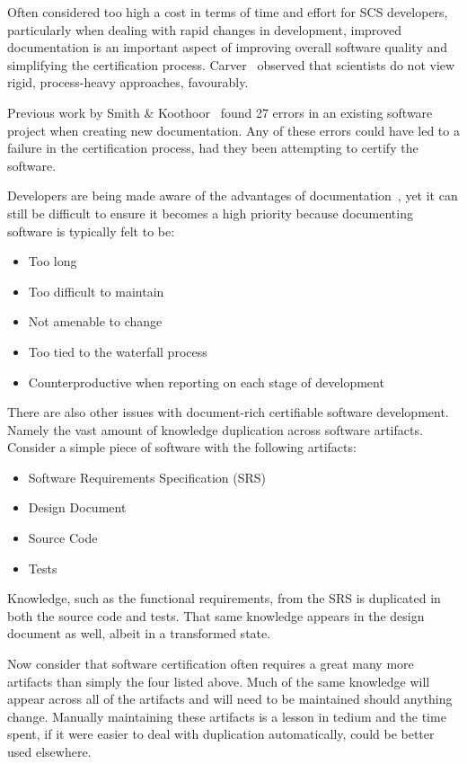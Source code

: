 \documentclass[sigconf]{acmart}
\begin{document}
Often considered too high a cost in terms of time and effort for SCS developers, 
particularly when dealing with rapid changes in development, improved 
documentation is an important aspect of improving overall software quality and 
simplifying the certification process. Carver~\cite{CarverEtAl2007} observed 
that scientists do not view rigid, process-heavy approaches, favourably. 

Previous work by Smith \& Koothoor~\citep{SmithAndKoothoor2016} found 27 errors 
in an existing software project when creating new documentation. Any of these errors could have led to a failure in the certification process, had they been attempting to certify the software.

Developers are being made aware of the advantages of documentation~\cite{SmithJegatheesanAndKelly2016}, yet it can still be difficult to ensure it becomes a high priority because documenting software is typically felt to be:

\begin{itemize}
\item Too long
\item Too difficult to maintain
\item Not amenable to change
\item Too tied to the waterfall process
\item Counterproductive when reporting on each stage of 
		development~\citep{Roache1998}
\end{itemize}

There are also other issues with document-rich certifiable software development. Namely the vast amount of knowledge duplication across software artifacts. Consider a simple piece of software with the following artifacts:

\begin{itemize}
\item Software Requirements Specification (SRS)
\item Design Document
\item Source Code
\item Tests
\end{itemize}
Knowledge, such as the functional requirements, from the SRS is duplicated in both the source code and tests. That same knowledge appears in the design document as well, albeit in a transformed state. 

Now consider that software certification often requires a great many more artifacts than simply the four listed above. Much of the same knowledge will appear across all of the artifacts and will need to be maintained should anything change. Manually maintaining these artifacts is a lesson in tedium and the time spent, if it were easier to deal with duplication automatically, could be better used elsewhere.
\end{document}
